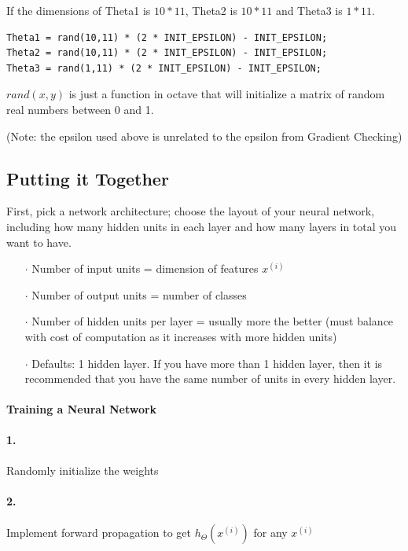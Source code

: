 \documentclass[UTF8]{article}
\begin{document}
If the dimensions of Theta1 is $10*11$, Theta2 is $10*11$ and Theta3 is $1*11$.

\begin{lstlisting}
Theta1 = rand(10,11) * (2 * INIT_EPSILON) - INIT_EPSILON;
Theta2 = rand(10,11) * (2 * INIT_EPSILON) - INIT_EPSILON;
Theta3 = rand(1,11) * (2 * INIT_EPSILON) - INIT_EPSILON;
\end{lstlisting}

$rand(x,y)$ is just a function in octave that will initialize a matrix of random real numbers between 0 and 1.

(Note: the epsilon used above is unrelated to the epsilon from Gradient Checking)

\subsection{Putting it Together}

First, pick a network architecture; choose the layout of your neural network, including how many hidden units in each layer and how many layers in total you want to have.

\begin{itemize}
\item[$\cdot$]Number of input units = dimension of features $x^{(i)}$
\item[$\cdot$]Number of output units = number of classes
\item[$\cdot$]Number of hidden units per layer = usually more the better (must balance with cost of computation as it increases with more hidden units)
\item[$\cdot$]Defaults: 1 hidden layer. If you have more than 1 hidden layer, then it is recommended that you have the same number of units in every hidden layer.
\end{itemize}

\paragraph{Training a Neural Network}

\paragraph{1.} Randomly initialize the weights
\paragraph{2.} Implement forward propagation to get $h_\Theta(x^{(i)})$ for any $x^{(i)}$
\end{document}
